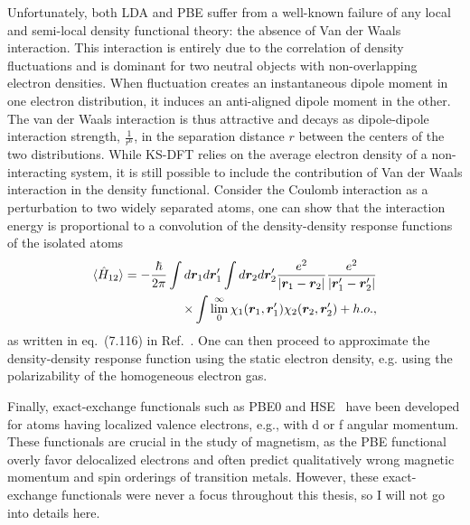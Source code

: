 Unfortunately, both LDA and PBE suffer from a well-known failure of any local and semi-local density functional theory: the absence of Van der Waals interaction.
This interaction is entirely due to the correlation of density fluctuations and is dominant for two neutral objects with non-overlapping electron densities.
When fluctuation creates an instantaneous dipole moment in one electron distribution, it induces an anti-aligned dipole moment in the other.
The van der Waals interaction is thus attractive and decays as dipole-dipole interaction strength, $\frac{1}{r^6}$, in the separation distance $r$ between the centers of the two distributions.
While KS-DFT relies on the average electron density of a non-interacting system, it is still possible to include the contribution of Van der Waals interaction in the density functional.
Consider the Coulomb interaction as a perturbation to two widely separated atoms, one can show that the interaction energy is proportional to a convolution of the density-density response functions of the isolated atoms
\begin{align}
\braket{\hat{H}_{12}} = -\dfrac{\hbar}{2\pi}
\int d\boldsymbol{r}_1d\boldsymbol{r}_1'
\int d\boldsymbol{r}_2d\boldsymbol{r}_2'
\dfrac{e^2}{\vert\boldsymbol{r}_1-\boldsymbol{r}_2\vert}
\dfrac{e^2}{\vert\boldsymbol{r}_1'-\boldsymbol{r}_2'\vert} \nonumber \\
\times\int\lim\limits_0^{\infty}
\chi_1(\boldsymbol{r}_1, \boldsymbol{r}_1')
\chi_2(\boldsymbol{r}_2, \boldsymbol{r}_2') + h.o.,
\end{align}
as written in eq.~(7.116) in Ref.~\cite{Giuliani2005}. One can then proceed to approximate the density-density response function using the static electron density, e.g. using the polarizability of the homogeneous electron gas.

Finally, exact-exchange functionals such as PBE0 and HSE~\cite{Heyd2003} have been developed for atoms having localized valence electrons, e.g., with d or f angular momentum.
These functionals are crucial in the study of magnetism, as the PBE functional overly favor delocalized electrons and often predict qualitatively wrong magnetic momentum and spin orderings of transition metals.
However, these exact-exchange functionals were never a focus throughout this thesis, so I will not go into details here.
